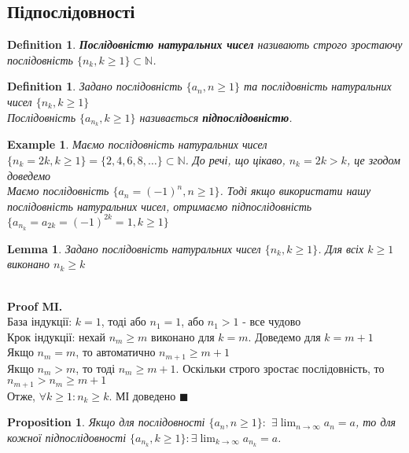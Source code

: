 \documentclass[a4paper, 14pt]{article}
\def\huge{\displaystyle}
\theoremstyle{theoremdd}
\theoremstyle{theoremdd}
\newtheorem{definition}[theorem]{Definition}
\theoremstyle{theoremdd}
\theoremstyle{theoremdd}
\newtheorem{example}[theorem]{Example}
\theoremstyle{theoremdd}
\newtheorem{proposition}[theorem]{Proposition}
\theoremstyle{theoremdd}
\theoremstyle{theoremdd}
\newtheorem{lemma}[theorem]{Lemma}
\theoremstyle{theoremdd}
\newenvironment{pfMI}{\vspace*{-3mm} \textbf{\\ Proof MI. \\}}{\hfill $\blacksquare$}
\begin{document}
	
	\subsection{Підпослідовності}
	\begin{definition}
	\textbf{Послідовністю натуральних чисел} називають строго зростаючу послідовність $\{n_k, k \geq 1\} \subset \mathbb{N}$.
	\end{definition}
	
	\begin{definition}
	Задано послідовність $\{a_n, n \geq 1\}$ та послідовність натуральних чисел $\{n_k, k \geq 1\}$\\
	Послідовність $\{a_{n_k}, k \geq 1\}$ називається \textbf{підпослідовністю}.
	\end{definition}
	
	\begin{example} Маємо послідовність натуральних чисел
	$\{n_k = 2k, k \geq 1 \} = \{2,4,6,8,\dots \} \subset \mathbb{N}$.
	До речі, що цікаво, $n_k = 2k > k$, це згодом доведемо\\
	Маємо послідовність $\{a_n = (-1)^n, n \geq 1\}$. Тоді якщо використати нашу послідовність натуральних чисел, отримаємо підпослідовність $\{a_{n_k} = a_{2k} = (-1)^{2k} = 1, k \geq 1\}$
	\end{example}
	
	\begin{lemma}
	Задано послідовність натуральних чисел $\{n_k, k \geq 1\}$. Для всіх $k \geq 1$ виконано $n_k \geq k$
	\end{lemma}
	
	\begin{pfMI}
	База індукції: $k = 1$, тоді або $n_1 = 1$, або $n_1 > 1$ - все чудово\\
	Крок індукції: нехай $n_m \geq m$ виконано для $k=m$. Доведемо для $k=m+1$\\
	Якщо $n_m = m$, то автоматично $n_{m+1} \geq m+1$\\
	Якщо $n_m > m$, то тоді $n_m \geq m+1$. Оскільки строго зростає послідовність, то $n_{m+1} > n_m \geq m+1$\\
	Отже, $\forall k \geq 1: n_k \geq k$. МІ доведено
	\end{pfMI}
	
	\begin{proposition}
	Якщо для послідовності $\{a_n, n \geq 1\}:$ $\displaystyle \exists \lim_{n \to \infty} a_n = a$, то для кожної підпослідовності $\huge \{a_{n_k}, k \geq 1\}:\exists \lim_{k \to \infty} a_{n_k} = a$.
	\end{proposition}
	
\end{document}
